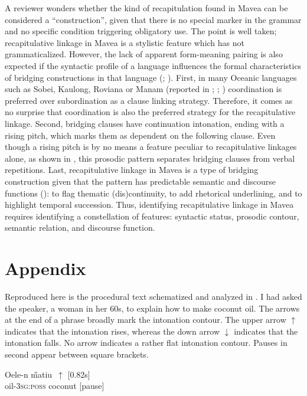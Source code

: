 \documentclass[output=paper]{LSP/langsci}
\begin{document}
A reviewer wonders whether the kind of recapitulation found in Mavea can be considered a ``construction'', given that there is no special marker in the grammar and no specific condition triggering obligatory use. The point is well taken; recapitulative linkage in Mavea is a stylistic feature which has not grammaticalized. However, the lack of apparent form-meaning pairing is also expected if the syntactic profile of a language influences the formal characteristics of bridging constructions in that language (\citealt{devries.2005}; \citealt[][898]{seifart10}). First, in many Oceanic languages such as Sobei, Kaulong, Roviana or Manam (reported in \citealt{bril10}; \citealt{Lichtenberk83}; \citealt[][53]{lynch02}) coordination is preferred over subordination as a clause linking strategy.  Therefore, it comes as no surprise that coordination is also the preferred strategy for the recapitulative linkage. Second, bridging clauses have continuation intonation, ending with a rising pitch, which marks them as dependent on the following clause. Even though a rising pitch is by no means a feature peculiar to recapitulative linkages alone, as shown in , this prosodic pattern separates bridging clauses from verbal repetitions. Last, recapitulative linkage in Mavea is a type of bridging construction given that the pattern has predictable semantic and discourse functions (): to flag thematic (dis)continuity, to add rhetorical underlining, and to highlight temporal succession. Thus, identifying recapitulative linkage in Mavea requires identifying a constellation of features: syntactic status, prosodic contour, semantic relation, and discourse function.

 \section*{Appendix}
 \setcounter{equation}{0}
 
Reproduced here is the procedural text schematized and analyzed in . I had asked the speaker, a woman in her 60s, to explain how to make coconut oil. The arrows at the end of a phrase broadly mark the intonation contour. The upper arrow $\uparrow$ indicates that the intonation rises, whereas the down arrow $\downarrow$  indicates that the intonation falls. No arrow indicates a rather flat intonation contour. Pauses in second appear between square brackets.
 
 \begin{exe}
\ex \label{Guapp1}
\gll    Oele-n          \H{m}atiu~$\uparrow$ [0.82s]\\     	       
 oil-\textsc{3sg:poss} coconut [pause]\\
\glt {} 
\end{exe}
\end{document}
